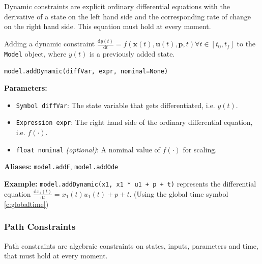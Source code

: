 \documentclass[12pt]{article}
\newcommand{\dd}{\mathrm{d}}
\renewcommand{\v}{\bm}
\begin{document}
Dynamic constraints are explicit ordinary differential equations with
the derivative of a state on the left hand side and the corresponding rate of
change on the right hand side. This equation must hold at every moment.

\begin{mdframed}[backgroundcolor=gray!10, roundcorner=10pt,
		linewidth=1pt]

	Adding a dynamic constraint $\frac{\dd y(t)}{\dd t} =
		f(\v{x}(t), \v{u}(t), \v{p}, t) \forall t \in [t_0, t_f]$ to
	the \texttt{Model}
	object, where $y(t)$ is a previously added state.

	\begin{lstlisting}
model.addDynamic(diffVar, expr, nominal=None)
		\end{lstlisting}
	\label{addDynamic}
	\textbf{Parameters:}
	\begin{itemize}
		\item \texttt{Symbol diffVar}: The state variable that
		      gets differentiated, i.e. $y(t)$.
		\item \texttt{Expression expr}: The right hand side of
		      the ordinary differential equation, i.e. $f(\cdot)$.
		\item \texttt{float nominal} \emph{(optional)}: A
		      nominal value of $f(\cdot)$ for scaling.
	\end{itemize}

	\textbf{Aliases:}  \texttt{model.addF}, \texttt{model.addOde}

	\textbf{Example:} \texttt{model.addDynamic(x1, x1 * u1 + p +
		t)} represents the differential equation
	$\frac{\dd x_1(t)}{\dd t} = x_1(t) u_1(t) + p + t$. (Using the
	global time symbol \ref{c:globaltime})
\end{mdframed}

\subsubsection{Path Constraints}

Path constraints are algebraic constraints on states, inputs,
parameters and time, that must hold at every moment.
\end{document}
